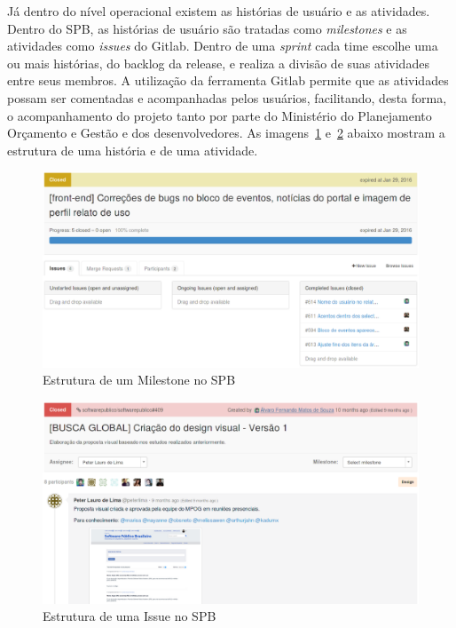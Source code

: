 Já dentro do nível operacional existem as histórias de usuário e as atividades.
Dentro do SPB, as histórias de usuário são tratadas como \textit{milestones} 
e as atividades como \textit{issues} do Gitlab. Dentro de uma \textit{sprint}
cada time escolhe uma ou mais  histórias, do backlog da release, e realiza a divisão
de suas atividades entre seus membros. A utilização da ferramenta Gitlab permite
que as atividades possam ser comentadas e acompanhadas pelos usuários, facilitando,
desta forma, o acompanhamento do projeto tanto por parte do Ministério do Planejamento
Orçamento e Gestão e dos desenvolvedores. As imagens~\ref{fig:milestone} e~\ref{fig:issue}
abaixo mostram a estrutura de uma história e de uma atividade.

\newpage
\begin{figure}[h]
    \centering
        \includegraphics[keepaspectratio=true,scale=0.5]{figuras/milestone.eps}
    \caption{Estrutura de um Milestone no SPB}
    \label{fig:milestone}
\end{figure}


\begin{figure}[h]
    \centering
        \includegraphics[keepaspectratio=true,scale=0.5]{figuras/issue.eps}
    \caption{Estrutura de uma Issue no SPB}
    \label{fig:issue}
\end{figure}

